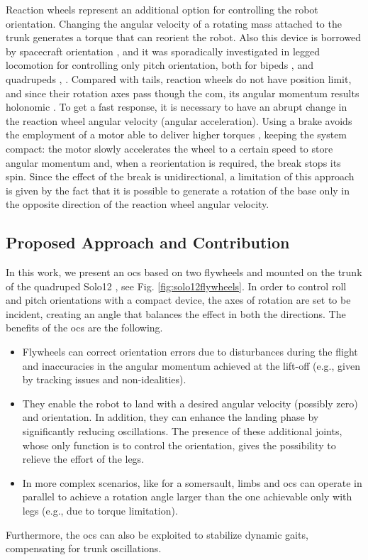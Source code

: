 \documentclass[letterpaper, 10 pt, conference]{ieeeconf}  %
\begin{document}
Reaction wheels represent an additional option for controlling the robot orientation.
Changing the angular velocity of a rotating mass attached to the trunk generates a torque that can reorient the robot. Also this device is borrowed by spacecraft orientation \cite{oland2009reaction}, and it was sporadically investigated in legged locomotion for controlling only pitch orientation, both for bipeds \cite{Brown2016}, \cite{xiong2020sequential} and quadrupeds \cite{kolvenbach2019towards}, \cite{vasilopoulos2016quadruped}.
Compared with tails, reaction wheels do not have position limit, and since their rotation axes pass though the \gls{com}, its angular momentum results holonomic \cite{machairas2015quadruped}.
To get a fast response, it is necessary to have an abrupt change in the reaction wheel angular velocity (angular acceleration).
Using a brake avoids the employment of a motor able to deliver higher torques \cite{gajamohan2012cubli}, keeping the system compact: the motor slowly accelerates the wheel to a certain speed to store angular momentum and, when a reorientation is required, the break stops its spin.
Since the effect of the break is unidirectional,
a limitation of this approach is given by the fact that it is possible to generate a rotation of the base only in the opposite direction of the reaction wheel angular velocity.

\subsection{Proposed Approach and Contribution}
In this work, we present an \gls{ocs} based on two flywheels and mounted on the trunk of the quadruped Solo12 \cite{grimminger2020open}, see Fig. \ref{fig:solo12flywheels}. In order to control roll and pitch orientations with a compact device, the axes of rotation are set to be incident, creating an angle that balances the effect in both the directions. The benefits of the \gls{ocs} are the following.
\begin{itemize}
	\item Flywheels can correct orientation errors due to disturbances during the flight and inaccuracies in the angular momentum achieved at the lift-off (e.g., given by tracking issues and non-idealities). 
	\item They enable the robot to land with a desired angular velocity (possibly zero) and orientation.
	In addition, they can enhance the landing phase by significantly reducing oscillations.  
	The presence of these additional joints, whose only function is to control the orientation, gives the possibility to relieve the effort of the legs.
	\item In more complex scenarios, like for a somersault, limbs and \gls{ocs} can operate in parallel to achieve a rotation angle larger than the one achievable only with legs (e.g., due to torque limitation). 
\end{itemize}
Furthermore, the \gls{ocs} can also be exploited to stabilize dynamic gaits, compensating for trunk oscillations.
\end{document}
